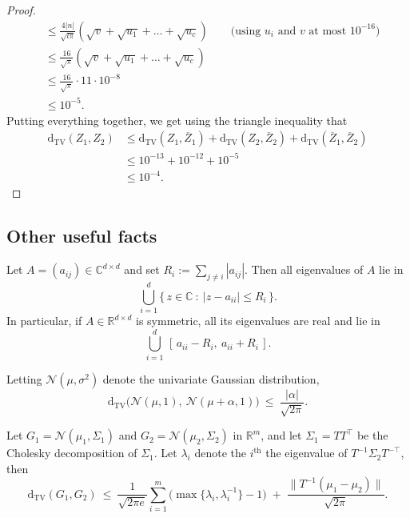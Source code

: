 \documentclass[10pt]{article} %
\theoremstyle{plain}
\newcommand{\dtv}{\mathrm{d_{TV}}}
\begin{document}
\begin{proof}
\begin{align*}
		&\le \frac{4|n|}{\sqrt{l\pi}}\left(\sqrt{v} + \sqrt{u_1} +\dots+ \sqrt{u_c} \right) \qquad \text{(using $u_i$ and $v$ at most $10^{-16}$)}\\
		&\le \frac{16}{\sqrt{\pi}}\left(\sqrt{v} + \sqrt{u_1} +\dots+ \sqrt{u_c} \right) \\
		&\le \frac{16}{\sqrt{\pi}} \cdot 11 \cdot 10^{-8} \\
		&\le 10^{-5}.
	\end{align*}
	Putting everything together, we get using the triangle inequality that
	\begin{align*}
		\dtv(Z_1, Z_2) &\le \dtv(Z_1, \overline{Z}_1) + \dtv(Z_2, \overline{Z}_2) + \dtv(\overline{Z}_1, \overline{Z}_2) \\
		&\le 10^{-13} + 10^{-12} + 10^{-5} \\
		&\le 10^{-4}.
	\end{align*}
\end{proof}

\subsection{Other useful facts}


\begin{fact}\citep[Theorem ~6.1.1]{horn2012matrix}
\label{fact:gershgorin}
Let $A=(a_{ij})\in\mathbb{C}^{d\times d}$ and set
$R_i:=\sum_{j\neq i} |a_{ij}|$. Then all eigenvalues of $A$
lie in
\[
\bigcup_{i=1}^d \Big\{\, z\in\mathbb{C}\ :\ |z-a_{ii}|\le R_i \,\Big\}.
\]
In particular, if $A\in\mathbb{R}^{d\times d}$ is symmetric, all its eigenvalues are real and lie in
\[
 \bigcup_{i=1}^d \,[\,a_{ii}-R_i,\ a_{ii}+R_i\,].
\]
\end{fact}




\begin{fact}
\label{fact:univariate_gaussian_tv}
Letting $\mathcal{N}(\mu,\sigma^2)$ denote the univariate Gaussian distribution,
\[
\mathrm{d}_{\mathrm{TV}}\!\big(\mathcal{N}(\mu,1),\ \mathcal{N}(\mu+\alpha,1)\big)\ \le\ \frac{|\alpha|}{\sqrt{2\pi}}.
\]
\end{fact}

\begin{fact}
\label{fact:multivariate_gaussian_tv}
Let $G_1=\mathcal{N}(\mu_1,\Sigma_1)$ and $G_2=\mathcal{N}(\mu_2,\Sigma_2)$ in $\mathbb{R}^m$, and let $\Sigma_1=TT^\top$ be the Cholesky decomposition of $\Sigma_1$. 
Let $\lambda_i$ denote the ${i}^{\text{th}}$ the eigenvalue of $T^{-1}\Sigma_2 T^{-\top}$, then
\[
\mathrm{d}_{\mathrm{TV}}(G_1,G_2)\ \le\ 
\frac{1}{\sqrt{2\pi e}}\sum_{i=1}^m\Big(\max\{\lambda_i,\lambda_i^{-1}\}-1\Big)
\;+\; \frac{\big\|T^{-1}(\mu_1-\mu_2)\big\|}{\sqrt{2\pi}}.
\]
\end{fact}
\end{document}
